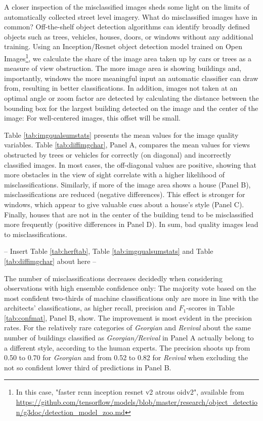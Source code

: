 \documentclass[]{article}
\begin{document}
A closer inspection of the misclassified images sheds some light on the
limits of automatically collected street level imagery. What do
misclassified images have in common? Off-the-shelf object detection
algorithms can identify broadly defined objects such as trees, vehicles,
houses, doors, or windows without any additional training. Using an
Inception/Resnet object detection model trained on Open
Images\footnote{In this case, "faster rcnn inception resnet v2 atrous oidv2", available from \url{https://github.com/tensorflow/models/blob/master/research/object_detection/g3doc/detection_model_zoo.md}},
we calculate the share of the image area taken up by cars or trees as a
measure of view obstruction. The more image area is showing buildings
and, importantly, windows the more meaningful input an automatic
classifier can draw from, resulting in better classifications. In
addition, images not taken at an optimal angle or zoom factor are
detected by calculating the distance between the bounding box for the
largest building detected on the image and the center of the image: For
well-centered images, this offset will be small.

Table \ref{tab:imgqualsumstats} presents the mean values for the image
quality variables. Table \ref{tab:diffimgchar}, Panel A, compares the
mean values for views obstructed by trees or vehicles for correctly (on
diagonal) and incorrectly classified images. In most cases, the
off-diagonal values are positive, showing that more obstacles in the
view of sight correlate with a higher likelihood of misclassifications.
Similarly, if more of the image area shows a house (Panel B),
misclassifications are reduced (negative differences). This effect is
stronger for windows, which appear to give valuable cues about a house's
style (Panel C). Finally, houses that are not in the center of the
building tend to be misclassified more frequently (positive differences
in Panel D). In sum, bad quality images lead to misclassifications.

\begin{center}
  -- Insert Table \ref{tab:herftab}, Table \ref{tab:imgqualsumstats} and Table \ref{tab:diffimgchar} about here --
\end{center}

The number of misclassifications decreases decidedly when considering
observations with high ensemble confidence only: The majority vote based
on the most confident two-thirds of machine classifications only are
more in line with the architects' classifications, as higher recall,
precision and \(F_1\)-scores in Table \ref{tab:confmat}, Panel B, show.
The improvement is most evident in the precision rates. For the
relatively rare categories of \emph{Georgian} and \emph{Revival} about
the same number of buildings classified as \emph{Georgian/Revival} in
Panel A actually belong to a different style, according to the human
experts. The precision shoots up from 0.50 to 0.70 for \emph{Georgian}
and from 0.52 to 0.82 for \emph{Revival} when excluding the not so
confident lower third of predictions in Panel B.
\end{document}
